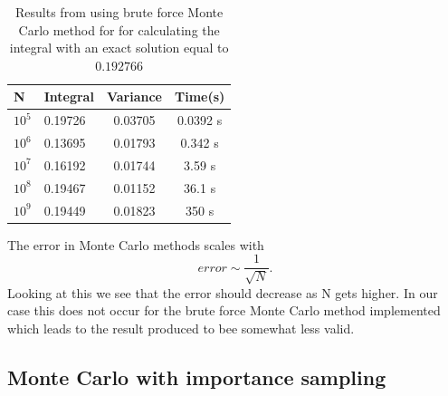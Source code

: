\documentclass[twoside,twocolumn]{article}
\begin{document}
\begin{table}[h]
\centering
\begin{tabular}{|l|l|c|c|}
\hline
N                     & Integral & \multicolumn{1}{l|}{Variance} & Time(s)  \\ \hline
$10^5$ & 0.19726  & 0.03705                       & 0.0392 s \\ \hline
$10^6$ & 0.13695  & 0.01793                       & 0.342 s  \\ \hline
$10^7$ & 0.16192  & 0.01744                       & 3.59 s   \\ \hline
$10^8$ &0.19467  & 0.01152                       & 36.1 s   \\ \hline
$10^9$ & 0.19449  & 0.01823                       & 350 s    \\ \hline
\end{tabular}
\caption{Results from using brute force Monte Carlo method for for calculating the integral with an exact solution equal to $0.192766$}
\end{table}
The error in Monte Carlo methods scales with
\begin{equation}
error \sim \frac{1}{\sqrt{N}}.
\end{equation}
Looking at this we see that the error should decrease as N gets higher. In our case this does not occur for the brute force Monte Carlo method implemented which leads to the result produced to bee somewhat less valid.

\subsection{Monte Carlo with importance sampling}
\end{document}
